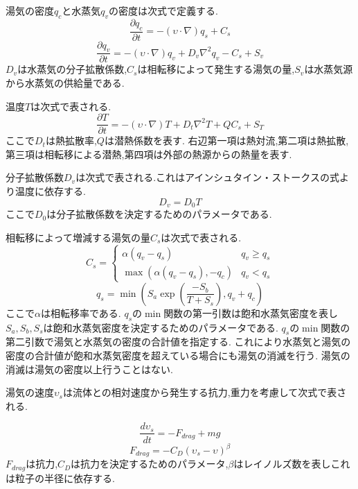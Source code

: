 湯気の密度$q_{c}$と水蒸気$q_{v}$の密度は次式で定義する.
\begin{equation}
\label{steam}
\frac{\partial q_{c}}{\partial t} = -(\upsilon \cdot \nabla)q_{s} + C_{s}
\end{equation}
\begin{equation}
\label{vapor}
\frac{\partial q_{v}}{\partial t} = -(\upsilon \cdot \nabla)q_{v} + D_{v}\nabla^2q_{v} - C_{s} + S_{v}
\end{equation}
$D_{v}$は水蒸気の分子拡散係数,$C_{s}$は相転移によって発生する湯気の量,$S_{v}$は水蒸気源から水蒸気の供給量である.

温度$T$は次式で表される.
\begin{equation}
\label{temperature}
\frac{\partial T}{\partial t} = - (\upsilon \cdot \nabla)T + D_{t}\nabla^2T +  QC_{s} + S_{T}
\end{equation}
ここで$D_{t}$は熱拡散率,$Q$は潜熱係数を表す.
右辺第一項は熱対流,第二項は熱拡散,第三項は相転移による潜熱,第四項は外部の熱源からの熱量を表す.

分子拡散係数$D_{v}$は次式で表される.これはアインシュタイン・ストークスの式より温度に依存する.
\begin{equation}
\label{diffusion}
D_{v}=D_{0}T
\end{equation}
ここで$D_{0}$は分子拡散係数を決定するためのパラメータである.

相転移によって増減する湯気の量$C_{s}$は次式で表される.
\begin{equation}
\label{transition} 
C_{s} =
\begin{cases}
 \alpha(q_{v}-q_{s}) & q_{v} \geq q_{s}\\
 \max\left(\alpha(q_{v}-q_{s}),-q_{c}\right) & q_{v} < q_{s}
\end{cases}
\end{equation}
\begin{equation}
\label{saturation}
q_{s} = \min\left(S_{a} \exp\left(\frac{-S_{b}}{T+S_{s}}\right),q_{v}+q_{c}\right)
\end{equation}
ここで$\alpha$は相転移率である.
$q_{s}$の$\min$関数の第一引数は飽和水蒸気密度を表し
$S_{a},S_{b},S_{s}$は飽和水蒸気密度を決定するためのパラメータである.
$q_{s}$の$\min$関数の第二引数で湯気と水蒸気の密度の合計値を指定する.
これにより水蒸気と湯気の密度の合計値が飽和水蒸気密度を超えている場合にも湯気の消滅を行う.
湯気の消滅は湯気の密度以上行うことはない.

湯気の速度$\upsilon_{s}$は流体との相対速度から発生する抗力,重力を考慮して次式で表される.

\begin{equation}
\label{lagurange}
\frac{d\upsilon_{s}}{dt} = - F_{drag} + mg
\end{equation}
\begin{equation}
\label{dragforce}
F_{drag} = - C_{D} (\upsilon_{s} - \upsilon)^\beta
\end{equation}
$F_{drag}$は抗力,$C_{D}$は抗力を決定するためのパラメータ,$\beta$はレイノルズ数を表しこれは粒子の半径に依存する.

